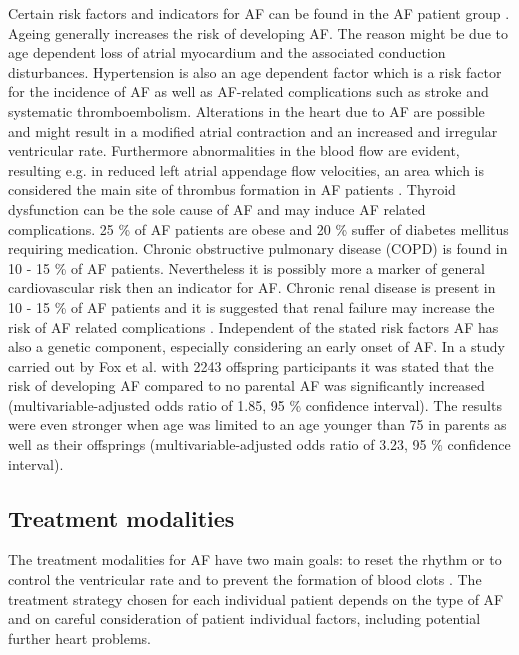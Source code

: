 \documentclass[type=dr, dr=rernat, accentcolor=tud7b,colorbacktitle, bigchapter, openright, twoside, 12pt ]{tudthesis}
\begin{document}
Certain risk factors and indicators for AF can be found in the AF patient group \cite{CE09}. Ageing generally increases the risk of 
developing AF. The reason might be due to age dependent loss of atrial myocardium and the associated conduction disturbances. Hypertension 
is also an age dependent factor which is a risk factor for the incidence of AF as well as AF-related complications such as stroke and 
systematic thromboembolism. Alterations in the heart due to AF are possible and might result in a modified atrial contraction and an 
increased and irregular ventricular rate. Furthermore abnormalities in the blood flow are evident, resulting e.g. in reduced left atrial 
appendage flow velocities, an area which is considered the main site of thrombus formation in AF patients \cite{ESC12}. Thyroid dysfunction
can be the sole cause of AF and may induce AF related complications. 25 \% of AF patients are obese \cite{Nab09} and 20 \% suffer of 
diabetes mellitus requiring medication. Chronic obstructive pulmonary 
disease (COPD) is found in 10 - 15 \% of AF patients. Nevertheless it is possibly more a marker of general cardiovascular risk then an 
indicator for AF. Chronic renal disease is present in 10 - 15 \% of AF patients and it is suggested that renal failure may increase the 
risk of AF related complications \cite{CE09}. Independent of the stated risk factors AF has also a genetic component, especially 
considering an early onset of AF. In a study carried out by Fox et al. \cite{Fox09} with 2243 offspring participants it was stated that the 
risk of developing AF compared to no parental AF was significantly increased (multivariable-adjusted odds ratio of 1.85, 95 \% confidence 
interval). The results were even stronger when age was limited to an age younger than 75 in parents as well as their offsprings 
(multivariable-adjusted odds ratio of 3.23, 95 \% confidence interval). 


\subsection{Treatment modalities}

The treatment modalities for AF have two main goals: to reset the rhythm or to control the ventricular rate and to prevent the formation of blood 
clots \cite{Mayo} \cite{CE09}. The treatment strategy chosen for each individual patient depends on the type of AF and on careful 
consideration of patient individual factors, including potential further heart problems. \newline
\end{document}
